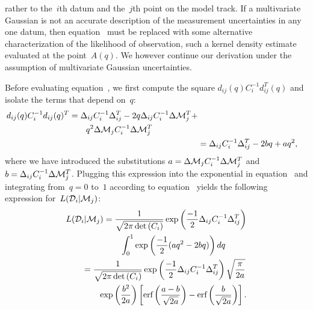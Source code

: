 \documentclass[ms.tex]{subfiles}
\begin{document}
rather to the~$i$th datum and the~$j$th point on the model track.
If a multivariate Gaussian is not an accurate description of the measurement
uncertainties in any one datum, then equation~ must
be replaced with some alternative characterization of the likelihood of
observation, such a kernel density estimate evaluated at the point~$A(q)$.
We however continue our derivation under the assumption of multivariate
Gaussian uncertainties.
\par
Before evaluating equation~, we first compute the square
$d_{ij}(q)C_i^{-1}d_{ij}^T(q)$ and isolate the terms that depend on~$q$:
\begin{subequations}\begin{align}
\begin{split}
d_{ij}(q) C_i^{-1} d_{ij}(q)^T &= \Delta_{ij} C_i^{-1} \Delta_{ij}^T -
2q\Delta_{ij}C_i^{-1}\Delta \mathcal{M}_j^T +
\\
&\qquad q^2\Delta \mathcal{M}_j C_i^{-1} \Delta \mathcal{M}_j^T
\end{split}
\label{eq:chisquared}
\\
&= \Delta_{ij} C_i^{-1} \Delta_{ij}^T - 2bq + aq^2,
\end{align}\end{subequations}
where we have introduced the substitutions
$a = \Delta\mathcal{M}_j C_i^{-1} \Delta\mathcal{M}_j^T$ and
$b = \Delta_{ij} C_i^{-1} \Delta\mathcal{M}_j^T$.
Plugging this expression into the exponential in equation~
and integrating from~$q = 0$ to~$1$ according to equation~
yields the following expression for~$L(\mathcal{D}_i | \mathcal{M}_j)$:
\begin{subequations}\begin{align}
\begin{split}
L(\mathcal{D}_i | \mathcal{M}_j) &= \frac{1}{\sqrt{2\pi \det{(C_i)}}}
\exp\left(\frac{-1}{2}\Delta_{ij} C_i^{-1} \Delta_{ij}^T\right)
\\
&\qquad \int_0^1 \exp\left(\frac{-1}{2}(aq^2 - 2bq)\right)dq
\end{split}
\\
\begin{split}
&= \frac{1}{\sqrt{2\pi\det{(C_i)}}}
\exp\left(\frac{-1}{2}\Delta_{ij}C_i^{-1}\Delta_{ij}^T\right)
\sqrt{\frac{\pi}{2a}}
\\
&\qquad \exp\left(\frac{b^2}{2a}\right)
\left[\text{erf}\left(\frac{a - b}{\sqrt{2a}}\right) - \text{erf}\left(\frac{b}{\sqrt{2a}}
\right)\right].
\end{split}
\end{align}\end{subequations}
\end{document}
